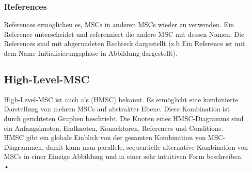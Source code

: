 \subsubsection{References}
References ermöglichen es, MSCs in anderen MSCs wieder
zu verwenden. 
Ein Reference unterscheidet und referenziert die andere MSC mit dessen Namen. 
Die References sind mit abgerundeten Rechteck dargestellt (z.b Ein Reference ist mit dem Name Initialisierungsphase in Abbildung dargestellt).\\


\subsection{High-Level-MSC}
High-Level-MSC ist auch als (HMSC) bekannt. Es ermöglicht eine kombinierte Darstellung von mehren MSCs auf abstrakter Ebene. Diese Kombination ist durch gerichteten Graphen beschriebt. Die Knoten eines HMSC-Diagramms sind ein Anfangsknoten, Endknoten, Konnektoren, References und Conditions.
\\ HMSC gibt ein globale Einblick von der gesamten Kombination von MSC-Diagrammen, damit kann man parallele, sequentielle alternative
Kombination von MSCs in einer Einzige Abbildung und in einer sehr intuitiven Form beschreiben.\\•



